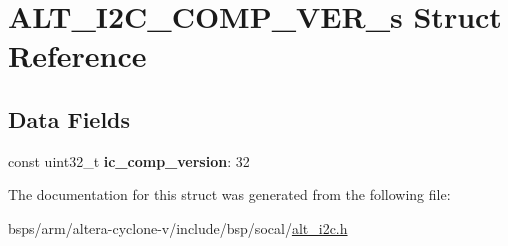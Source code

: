 \hypertarget{structALT__I2C__COMP__VER__s}{}\section{A\+L\+T\+\_\+\+I2\+C\+\_\+\+C\+O\+M\+P\+\_\+\+V\+E\+R\+\_\+s Struct Reference}
\label{structALT__I2C__COMP__VER__s}
\subsection*{Data Fields}
\begin{DoxyCompactItemize}
\item 
\mbox{\label{structALT__I2C__COMP__VER__s_a61afebbee2857bc94262fb7b9ec78ff3}} 
const uint32\+\_\+t {\bfseries ic\+\_\+comp\+\_\+version}\+: 32
\end{DoxyCompactItemize}


The documentation for this struct was generated from the following file\+:\begin{DoxyCompactItemize}
\item 
bsps/arm/altera-\/cyclone-\/v/include/bsp/socal/\mbox{\hyperlink{socal_2alt__i2c_8h}{alt\+\_\+i2c.\+h}}\end{DoxyCompactItemize}
